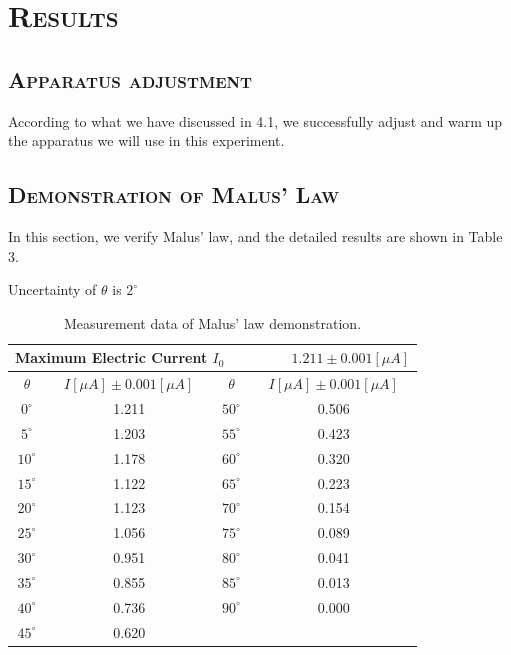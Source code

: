 \documentclass[a4paper,12pt]{article}
\begin{document}
\section{\textsc{Results}}
\subsection{\textsc{Apparatus adjustment}}
According to what we have discussed in 4.1, we successfully adjust and warm up the apparatus we will use in this experiment.

\subsection{\textsc{Demonstration of Malus’ Law}}
In this section, we verify Malus' law, and the detailed results are shown in Table 3.

\newpage
Uncertainty of $\theta$ is $2^{\circ}$
\begin{table}[h]
\begin{center}
\begin{tabular}{|c|c||c|c|}
\hline
\multicolumn{4}{|c|}{Maximum Electric Current $I_0$ ~~~~~~~ $ 1.211 \pm 0.001 [\mu A]$} \\
\hline
$\theta$ & $I [\mu A] \pm 0.001 [\mu A]$ & $\theta$ & $I [\mu A] \pm 0.001 [\mu A]$ \\
\hline
$0^{\circ}$ & 1.211 & $50^{\circ}$ & 0.506\\
\hline
$5^{\circ}$ & 1.203 & $55^{\circ}$ & 0.423\\
\hline 
$10^{\circ}$ & 1.178 & $60^{\circ}$ & 0.320\\
\hline
$15^{\circ}$ & 1.122 & $65^{\circ}$ & 0.223\\
\hline
$20^{\circ}$ & 1.123 & $70^{\circ}$ & 0.154\\
\hline
$25^{\circ}$ & 1.056 & $75^{\circ}$ & 0.089\\
\hline
$30^{\circ}$ & 0.951 & $80^{\circ}$ & 0.041\\
\hline
$35^{\circ}$ & 0.855 & $85^{\circ}$ & 0.013\\
\hline
$40^{\circ}$ & 0.736 & $90^{\circ}$ & 0.000\\
\hline
$45^{\circ}$ & 0.620 &  &  \\
\hline
\end{tabular}
\caption{Measurement data of Malus' law demonstration.}
\end{center}
\end{table}
\end{document}
